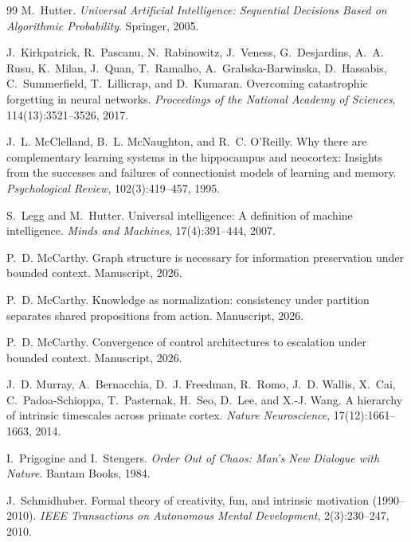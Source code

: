 \documentclass[11pt]{article}
\theoremstyle{definition}
\theoremstyle{remark}
\begin{document}
\begin{thebibliography}{99}
M.~Hutter.
\newblock \emph{Universal Artificial Intelligence: Sequential Decisions Based
  on Algorithmic Probability}.
\newblock Springer, 2005.

J.~Kirkpatrick, R.~Pascanu, N.~Rabinowitz, J.~Veness, G.~Desjardins,
  A.~A. Rusu, K.~Milan, J.~Quan, T.~Ramalho, A.~Grabska-Barwinska,
  D.~Hassabis, C.~Summerfield, T.~Lillicrap, and D.~Kumaran.
\newblock Overcoming catastrophic forgetting in neural networks.
\newblock \emph{Proceedings of the National Academy of Sciences},
  114(13):3521--3526, 2017.

J.~L. McClelland, B.~L. McNaughton, and R.~C. O'Reilly.
\newblock Why there are complementary learning systems in the hippocampus
  and neocortex: Insights from the successes and failures of connectionist
  models of learning and memory.
\newblock \emph{Psychological Review}, 102(3):419--457, 1995.

S.~Legg and M.~Hutter.
\newblock Universal intelligence: A definition of machine intelligence.
\newblock \emph{Minds and Machines}, 17(4):391--444, 2007.

P.~D. McCarthy.
\newblock Graph structure is necessary for information preservation under
  bounded context.
\newblock Manuscript, 2026.

P.~D. McCarthy.
\newblock Knowledge as normalization: consistency under partition separates
  shared propositions from action.
\newblock Manuscript, 2026.

P.~D. McCarthy.
\newblock Convergence of control architectures to escalation under bounded
  context.
\newblock Manuscript, 2026.

J.~D. Murray, A.~Bernacchia, D.~J. Freedman, R.~Romo, J.~D. Wallis,
  X.~Cai, C.~Padoa-Schioppa, T.~Pasternak, H.~Seo, D.~Lee, and
  X.-J. Wang.
\newblock A hierarchy of intrinsic timescales across primate cortex.
\newblock \emph{Nature Neuroscience}, 17(12):1661--1663, 2014.

I.~Prigogine and I.~Stengers.
\newblock \emph{Order Out of Chaos: Man's New Dialogue with Nature}.
\newblock Bantam Books, 1984.

J.~Schmidhuber.
\newblock Formal theory of creativity, fun, and intrinsic motivation
  (1990--2010).
\newblock \emph{IEEE Transactions on Autonomous Mental Development},
  2(3):230--247, 2010.


\end{thebibliography}
\end{document}
